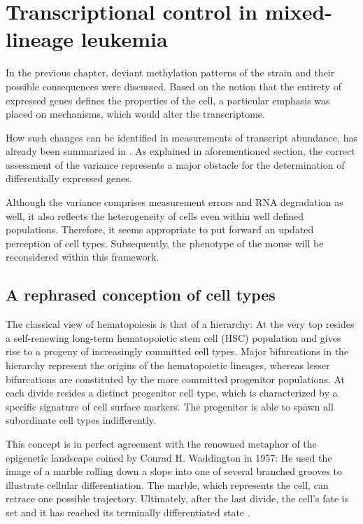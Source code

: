 \chapter{Transcriptional control in mixed-lineage leukemia}
\label{chap:d:transcriptionalcontrol}
\minitoc

In the previous chapter, deviant methylation patterns of the \dnmtchip strain and their possible consequences were discussed. Based on the notion that the entirety of expressed genes defines the properties of the cell, a particular emphasis was placed on mechanisms, which would alter the transcriptome. 

How such changes can be identified in measurements of transcript abundance, has already been summarized in .  As explained in aforementioned section, the correct assessment of the variance represents a major obstacle for the determination of differentially expressed genes. 

Although the variance comprises measurement errors and RNA degradation as well, it also reflects the heterogeneity of cells even within well defined populations. Therefore, it seems appropriate to put forward an updated perception of cell types. Subsequently, the phenotype of the \dnmtchip mouse will be reconsidered within this framework.

\section{A rephrased conception of cell types}
\label{chap:d:transcriptionalcontrol:celltype}

The classical view of hematopoiesis is that of a hierarchy: At the very top resides a self-renewing long-term hematopoietic stem cell (HSC) population\cite{Wilson2007} and gives rise to a progeny of increasingly committed cell types\cite{Reya2001,Lara-Astiaso2014}. Major bifurcations in the hierarchy represent the origins of the hematopoietic lineages, whereas lesser bifurcations are constituted by the more committed progenitor populations. At each divide resides a distinct progenitor cell type, which is characterized by a specific signature of cell surface markers. The progenitor is able to spawn all subordinate cell types indifferently.   

This concept is in perfect agreement with the renowned metaphor of the epigenetic landscape coined by Conrad H. Waddington in 1957\cite{waddington1957}: He used the image of a marble rolling down a slope into one of several branched grooves to illustrate cellular differentiation. The marble, which represents the cell, can retrace one possible trajectory. Ultimately, after the last divide, the cell's fate is set and it has reached its terminally differentiated state 	. 

